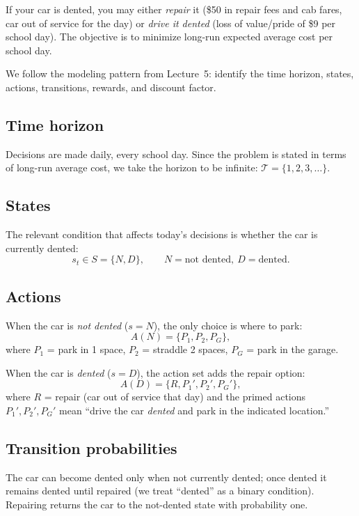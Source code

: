 \documentclass[12pt]{article}
\begin{document}
If your car is dented, you may either \emph{repair} it (\$50 in repair fees and cab fares, car out of service for the day) or \emph{drive it dented} (loss of value/pride of \$9 per school day). The objective is to minimize long-run expected average cost per school day.

We follow the modeling pattern from Lecture~5: identify the time horizon, states, actions, transitions, rewards, and discount factor.

\subsection*{Time horizon}

Decisions are made daily, every school day. Since the problem is stated in terms of long-run average cost, we take the horizon to be infinite: $\mathcal{T} = \{1, 2, 3, \ldots\}$.

\subsection*{States}

The relevant condition that affects today's decisions is whether the car is currently dented:
\[
  s_t \in S = \{N, D\}, \qquad N = \text{not dented},\ D = \text{dented}.
\]

\subsection*{Actions}

When the car is \emph{not dented} ($s = N$), the only choice is where to park:
\[
  A(N) = \{P_1, P_2, P_G\},
\]
where $P_1$ = park in 1 space, $P_2$ = straddle 2 spaces, $P_G$ = park in the garage.

When the car is \emph{dented} ($s = D$), the action set adds the repair option:
\[
  A(D) = \{R, P_1', P_2', P_G'\},
\]
where $R$ = repair (car out of service that day) and the primed actions $P_1', P_2', P_G'$ mean ``drive the car \emph{dented} and park in the indicated location.''

\subsection*{Transition probabilities}

The car can become dented only when not currently dented; once dented it remains dented until repaired (we treat ``dented'' as a binary condition). Repairing returns the car to the not-dented state with probability one.
\end{document}
